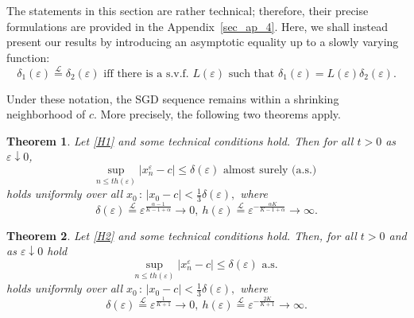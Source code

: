 \documentclass{article}
\theoremstyle{plain}
\newtheorem{theorem}{Theorem}[section]
\theoremstyle{definition}
\theoremstyle{remark}
\newcommand{\ra }{ \rightarrow} %
\begin{document}
The statements in this section are rather technical; therefore, their precise formulations are provided in the Appendix~\ref{sec_ap_4}. Here, we shall instead present our results by introducing an asymptotic equality up to a slowly varying function:
\begin{equation*}
\delta_1(\varepsilon) \overset{\mathcal{L}}{=} \delta_2 (\varepsilon) \text{ iff there is a s.v.f. $L(\varepsilon)$ such that  } \delta_1(\varepsilon) = L(\varepsilon) \delta_2(\varepsilon).
\end{equation*}

Under these notation, the SGD sequence remains within a shrinking neighborhood of $c$. More precisely, the following two theorems apply.
\begin{theorem}\label{th1_crit_point_simple}
    Let \ref{H1} and some technical conditions hold. Then for all $t >0$  
     as $\varepsilon\downarrow 0$,
    \begin{equation*}
        \sup\limits_{n \leqslant t h(\varepsilon)}|x^{\varepsilon}_{n} - c| \leqslant \delta(\varepsilon) \text{ almost surely (a.s.) }
    \end{equation*}
    holds uniformly over all $x_0 \,:\, |x_0 - c|< \frac{1}{3} \delta(\varepsilon),$ where 
\begin{equation*}
        \delta(\varepsilon) \overset{\mathcal{L}}{=}          \varepsilon^{\frac{\alpha-1}{K-1+\alpha}} \ra 0,     \       h(\varepsilon) \overset{\mathcal{L}}{=}  \varepsilon^{-\frac{\alpha K}{K-1+\alpha}} \ra \infty. 
    \end{equation*}
\end{theorem}

\begin{theorem}\label{th2_crit_point_simple}
    Let \ref{H2} and some technical conditions hold.   
    Then, for all $t >0$ and as $\varepsilon\downarrow 0$ hold
    \begin{equation*}
        \sup\limits_{n \leqslant t h(\varepsilon)}|x^{\varepsilon}_{n} - c| \leqslant \delta(\varepsilon) \text{ a.s. }
    \end{equation*}
    holds uniformly over all $x_0 \,:\, |x_0 - c|< \frac{1}{3} \delta(\varepsilon),$ where
          \begin{equation*}
        \delta(\varepsilon) \overset{\mathcal{L}}{=}
        \varepsilon^{\frac{1}{K+1}} \ra 0, \     h(\varepsilon)  \overset{\mathcal{L}}{=}  \varepsilon^{-\frac{2K}{K+1}} \ra \infty.  
        \end{equation*}
\end{theorem}
\end{document}
